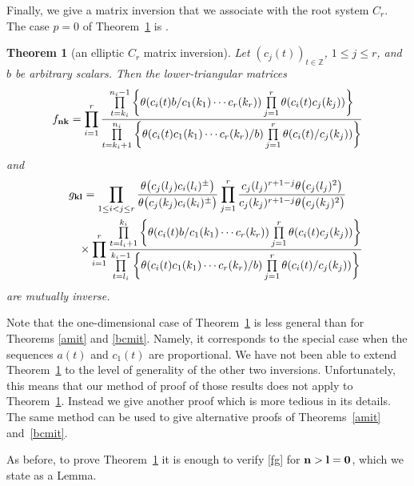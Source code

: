 \documentclass[11pt]{article}
\numberwithin{equation}{section}
\newtheorem{Theorem}{Theorem}[section]
\begin{document}
\setcounter{section}{3}
\setcounter{subsection}{1}
\setcounter{subsubsection}{0}
\setcounter{Theorem}{4}
\setcounter{equation}{1}
Finally, we give a matrix inversion that we associate with the
root system $C_r$. The case $p=0$ of Theorem~\ref{cmit} is \cite[Theorem~4.1]{s}.

\begin{Theorem}[an elliptic $C_r$ matrix inversion]\label{cmit}
Let $(c_j(t))_{t\in\mathbb Z}$, $1 \leq j \leq r$, and $b$ be arbitrary scalars. Then the lower-triangular matrices
\begin{gather*}f_{\bf nk}=\prod\limits_{i=1}^r\frac{\prod\limits_{t=k_i}^{n_i-1}
\bigg\{\theta(c_i(t)b/c_1(k_1)\dotsm c_r(k_r))\prod\limits_{j=1}^r\theta(c_i(t)c_j(k_j))\bigg\}}
{\prod\limits_{t=k_i+1}^{n_i} \bigg\{\theta(c_i(t)c_1(k_1)\dotsm c_r(k_r)/b)
\prod\limits_{j=1}^r\theta(c_i(t)/c_j(k_j))\bigg\}}
\end{gather*}
and
\begin{gather*}
g_{\bf kl}=
\prod\limits_{1\leq i<j\leq r}\frac{\theta\big(c_j(l_j)c_i(l_i)^\pm\big)}
{\theta\big(c_j(k_j)c_i(k_i)^\pm\big)}
\prod\limits_{j=1}^r\frac{c_j(l_j)^{r+1-j}\theta\big(c_j(l_j)^2\big)}
{c_j(k_j)^{r+1-j}\theta\big(c_j(k_j)^2\big)}
\\ \phantom{g_{\bf kl}=}{}
\times\prod\limits_{i=1}^r\frac{\prod\limits_{t=l_i+1}^{k_i}
\bigg\{\theta(c_i(t)b/c_1(k_1)\dotsm
 c_r(k_r))\prod\limits_{j=1}^r\theta(c_i(t)c_j(k_j))\bigg\}}
{\prod\limits_{t=l_i}^{k_i-1}
\bigg\{\theta(c_i(t)c_1(k_1)\dotsm c_r(k_r)/b)
\prod\limits_{j=1}^r\theta(c_i(t)/c_j(k_j))\bigg\}}
\end{gather*}
are mutually inverse.
\end{Theorem}



Note that the one-dimensional case of Theorem~\ref{cmit} is less
general than for Theorems \ref{amit} and \ref{bcmit}. Namely, it
corresponds to the special case when the sequences $a(t)$ and $c_1(t)$
are proportional. We have not been able to extend
Theorem~\ref{cmit} to the level of generality of the
other two inversions. Unfortunately, this means that our method of
proof of those results does not apply to Theorem~\ref{cmit}.
Instead we give another proof which
is more tedious in its details. The same method can be used to
give alternative proofs of
 Theorems~\ref{amit} and~\ref{bcmit}.

As before, to prove Theorem~\ref{cmit}
it is enough to verify \eqref{fg}
for ${\bf n}>\bf l=\bf 0$, which we state as a Lemma.
\end{document}
